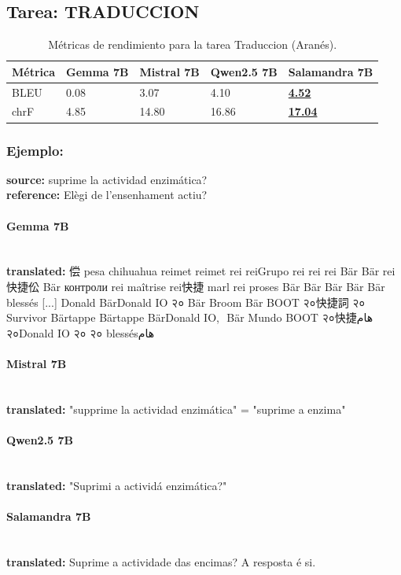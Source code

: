\subsection{Tarea: TRADUCCION}\label{tarea-traduccion}
\begin{longtable}[]{@{}lllll@{}}
\toprule\noalign{}
Métrica & Gemma 7B & Mistral 7B & Qwen2.5 7B & Salamandra 7B \\
\midrule\noalign{}
\endhead
\bottomrule\noalign{}
\caption{Métricas de rendimiento para la tarea Traduccion (Aranés).}
\label{tab:metricas_traduccion_Aranés}
\endlastfoot
BLEU & 0.08 & 3.07 & 4.10 & \textbf{\underline{4.52}} \\
chrF & 4.85 & 14.80 & 16.86 & \textbf{\underline{17.04}} \\
\end{longtable}

\subsubsection{Ejemplo:}
\textbf{source:} suprime la actividad enzimática?\\
\textbf{reference:} Elègi de l’ensenhament actiu?

\paragraph{Gemma 7B}~\\
\textbf{translated:} 偿 pesa chihuahua reimet reimet rei reiGrupo rei rei rei Bär Bär rei快捷伀 Bär контроли rei maîtrise rei快捷 marl rei proses Bär Bär Bär Bär Bär blessés [...] Donald BärDonald IO २० Bär Broom Bär BOOT २०快捷詞 २० Survivor Bärtappe Bärtappe BärDonald IO,\,\ Bär Mundo BOOT २०快捷هام २०Donald IO २० २० blessésهام

\paragraph{Mistral 7B}~\\
\textbf{translated:} "supprime la actividad enzimática" = "suprime a enzima"

\paragraph{Qwen2.5 7B}~\\
\textbf{translated:} "Suprimi a actividá enzimática?"

\paragraph{Salamandra 7B}~\\
\textbf{translated:} Suprime a actividade das encimas?  A resposta é si.

